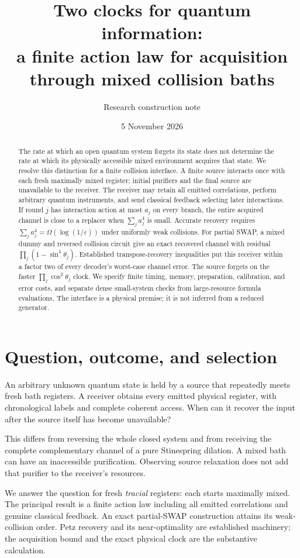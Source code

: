 \documentclass[11pt]{article}
\title{Two clocks for quantum information:\\
 a finite action law for acquisition through mixed collision baths}
\author{Research construction note}
\date{5 November 2026}
\numberwithin{equation}{section}
\theoremstyle{remark}
\newcommand{\eps}{\varepsilon}
\begin{document}
\maketitle

\begin{abstract}
The rate at which an open quantum system forgets its state does not determine
the rate at which its physically accessible mixed environment acquires that
state. We resolve this distinction for a finite collision interface. A finite
source interacts once with each fresh maximally mixed register; initial
purifiers and the final source are unavailable to the receiver. The receiver
may retain all emitted correlations, perform arbitrary quantum instruments,
and send classical feedback selecting later interactions. If round \(j\) has
interaction action at most \(a_j\) on every branch, the entire acquired channel
is close to a replacer when \(\sum_j a_j^4\) is small. Accurate recovery
requires \(\sum_j a_j^4=\Omega(\log(1/\eps))\) under uniformly weak collisions.
For partial SWAP, a mixed dummy and reversed collision circuit give an exact
recovered channel with residual \(\prod_j(1-\sin^4\theta_j)\). Established
transpose-recovery inequalities put this receiver within a factor two of
every decoder's worst-case channel error. The source forgets on the faster
\(\prod_j\cos^2\theta_j\) clock. We specify finite timing, memory, preparation,
calibration, and error costs, and separate dense small-system checks from
large-resource formula evaluations. The interface is a physical premise; it
is not inferred from a reduced generator.
\end{abstract}

\section{Question, outcome, and selection}
\label{sec:question}
An arbitrary unknown quantum state is held by a source that repeatedly meets
fresh bath registers. A receiver obtains every emitted physical register,
with chronological labels and complete coherent access. When can it recover
the input after the source itself has become unavailable?

This differs from reversing the whole closed system and from receiving the
complete complementary channel of a pure Stinespring dilation. A mixed bath
can have an inaccessible purification. Observing source relaxation does not
add that purifier to the receiver's resources.

We answer the question for fresh \emph{tracial} registers: each starts
maximally mixed. The principal result is a finite action law including all
emitted correlations and genuine classical feedback. An exact partial-SWAP
construction attains its weak-collision order. Petz recovery and its
near-optimality are established machinery; the acquisition bound and the
exact physical clock are the substantive calculation.
\end{document}
